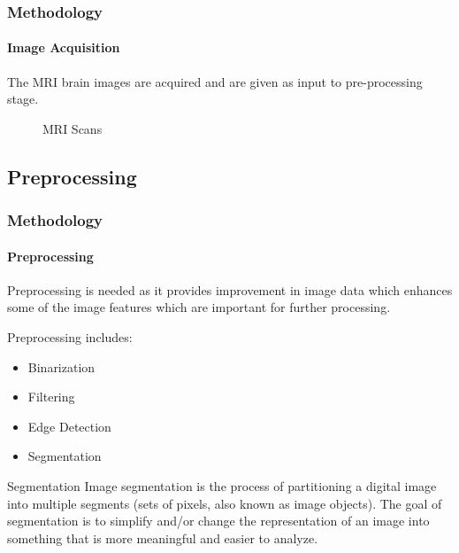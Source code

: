 \documentclass[10pt, aspectratio=169]{beamer}
\begin{document}
	\begin{frame}
		\frametitle{Methodology}
		\framesubtitle{Image Acquisition}
		The MRI brain images are acquired and are given as input to
		pre-processing stage.

		\begin{figure}[H]
			\centering
			\hspace{0.2cm}
			\caption{MRI Scans}
			\label{MRIScans}
		\end{figure}
	\end{frame}

	\subsection{Preprocessing}

	\begin{frame}
		\frametitle{Methodology}
		\framesubtitle{Preprocessing}

		Preprocessing is needed as it provides improvement in image data which
		enhances some of the image features which are important for further
		processing.

		\vspace{0.5cm}

		Preprocessing includes:

		\begin{itemize}
			\item Binarization
			\item Filtering
			\item Edge Detection
			\item Segmentation
		\end{itemize}

		\begin{block}{Segmentation}
			Image segmentation is the process of partitioning a digital image into multiple
			segments (sets of pixels, also known as image objects). The goal of
			segmentation is to simplify and/or change the representation of an image into
			something that is more meaningful and easier to analyze.
		\end{block}

	\end{frame}
\end{document}
